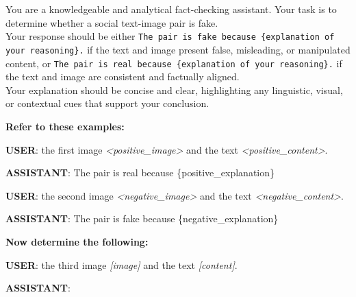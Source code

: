 \begin{tcolorbox}[title=Prompt \textsc{III}: Fake News Detection with Retrieval, boxrule=0pt, left=1mm, right=1mm, top=1mm, bottom=1mm, fontupper=\small]
You are a knowledgeable and analytical fact-checking assistant. Your task is to determine whether a social text-image pair is fake.\\

Your response should be either \texttt{The pair is fake because \{explanation of your reasoning\}.} if the text and image present false, misleading, or manipulated content, or \texttt{The pair is real because \{explanation of your reasoning\}.} if the text and image are consistent and factually aligned.\\

Your explanation should be concise and clear, highlighting any linguistic, visual, or contextual cues that support your conclusion.

\vspace{1mm}
\textbf{Refer to these examples:}

\textbf{USER}: the first image \textit{\textless positive\_image\textgreater} and the text \textit{\textless positive\_content\textgreater}.

\textbf{ASSISTANT}: The pair is real because \{positive\_explanation\}

\textbf{USER}: the second image \textit{\textless negative\_image\textgreater} and the text \textit{\textless negative\_content\textgreater}.
    
\textbf{ASSISTANT}: The pair is fake because \{negative\_explanation\}

\vspace{1mm}
\textbf{Now determine the following:}

\textbf{USER}: the third image \textit{[image]} and the text \textit{[content]}.

\textbf{ASSISTANT}:
\end{tcolorbox}

